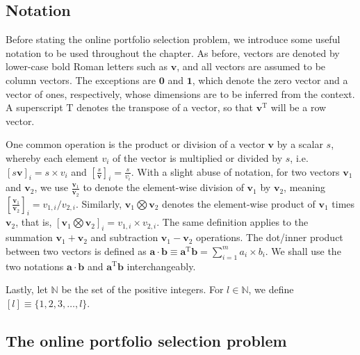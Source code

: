 \subsection{Notation}

Before stating the online portfolio selection problem, we introduce some useful notation to be used throughout the chapter. As before, vectors are denoted by lower-case bold Roman letters such as $\mathbf{v}$, and all vectors are assumed to be column vectors. The exceptions are $\mathbf{0}$ and $\mathbf{1}$, which denote the zero vector and a vector of ones, respectively, whose dimensions are to be inferred from the context. A superscript $\text{T}$ denotes the transpose of a vector, so that $\mathbf{v}^\text{T}$ will be a row vector.

One common operation is the product or division of a vector $\mathbf{v}$ by a scalar $s$, whereby each element $v_i$ of the vector is multiplied or divided by $s$, i.e.\ $[s\mathbf{v}]_i = s \times v_i$ and $\left[\frac{s}{\mathbf{v}}\right]_i = \frac{s}{v_i}$.
With a slight abuse of notation, for two vectors $\mathbf{v}_1$ and $\mathbf{v}_2$, we use $\frac{\mathbf{v}_1}{\mathbf{v}_2}$ to denote the element-wise division of $\mathbf{v}_1$ by $\mathbf{v}_2$, meaning $\left[\frac{\mathbf{v}_1}{\mathbf{v}_2}\right]_i = v_{1,i} / v_{2,i}$. Similarly, $\mathbf{v}_1 \bigotimes \mathbf{v}_2$ denotes the element-wise product of $\mathbf{v}_1$ times $\mathbf{v}_2$, that is, $[\mathbf{v}_1 \bigotimes \mathbf{v}_2]_i = v_{1,i} \times v_{2,i}$. The same definition applies to the summation $\mathbf{v}_1 + \mathbf{v}_2$ and subtraction $\mathbf{v}_1 - \mathbf{v}_2$ operations. The dot/inner product between two vectors is defined as $\mathbf{a} \cdot \mathbf{b} \equiv \mathbf{a}^\text{T}\mathbf{b} = \sum_{i=1}^m a_i \times b_i$. We shall use the two notations $\mathbf{a} \cdot \mathbf{b}$ and $\mathbf{a}^\text{T}\mathbf{b}$ interchangeably.

Lastly, let $\mathbb{N}$ be the set of the positive integers. For $l \in \mathbb{N}$, we define $[l] \equiv \{1, 2, 3, \ldots, l\}$.

\subsection{The online portfolio selection problem}
\label{sec:olps-model}

